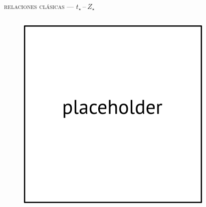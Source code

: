 \documentclass[xcolor=dvipsnames,4pt,hyperref={colorlinks,citecolor=black,linkcolor=black,urlcolor=black}]{beamer}
\begin{document}
\begin{frame}{\textsc{relaciones clásicas --- $t_\star\,$--$\,Z_\star$}}

\begin{columns}
\begin{figure}
\includegraphics[scale=1]{img/placeholder}
\end{figure}
%



\end{columns}
\end{frame}
\end{document}

